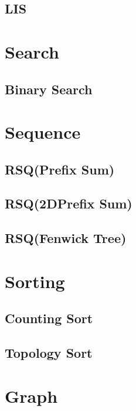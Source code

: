 \subsection{LIS}

\section{Search}

\subsection{Binary Search}

\section{Sequence}

\subsection{RSQ(Prefix Sum)}


\subsection{RSQ(2DPrefix Sum)}


\subsection{RSQ(Fenwick Tree)}

\section{Sorting}

\subsection{Counting Sort}


\subsection{Topology Sort}


\section{Graph}


